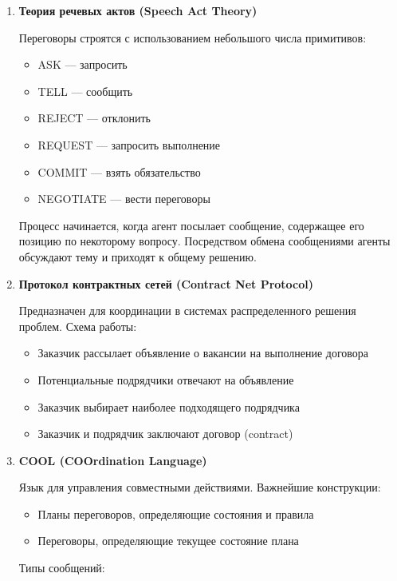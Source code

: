 \begin{enumerate}
  \item \textbf{Теория речевых актов (Speech Act Theory)}
  
  Переговоры строятся с использованием небольшого числа примитивов:
  
  \begin{itemize}
    \item ASK — запросить
    \item TELL — сообщить
    \item REJECT — отклонить
    \item REQUEST — запросить выполнение
    \item COMMIT — взять обязательство
    \item NEGOTIATE — вести переговоры
  \end{itemize}
  
  Процесс начинается, когда агент посылает сообщение, содержащее его позицию по некоторому вопросу. Посредством обмена сообщениями агенты обсуждают тему и приходят к общему решению.
  
  \item \textbf{Протокол контрактных сетей (Contract Net Protocol)}
  
  Предназначен для координации в системах распределенного решения проблем. Схема работы:
  
  \begin{itemize}
    \item Заказчик рассылает объявление о вакансии на выполнение договора
    \item Потенциальные подрядчики отвечают на объявление
    \item Заказчик выбирает наиболее подходящего подрядчика
    \item Заказчик и подрядчик заключают договор (contract)
  \end{itemize}
  
  \item \textbf{COOL (COOrdination Language)}
  
  Язык для управления совместными действиями. Важнейшие конструкции:
  
  \begin{itemize}
    \item Планы переговоров, определяющие состояния и правила
    \item Переговоры, определяющие текущее состояние плана
  \end{itemize}
  
  Типы сообщений:
  

\end{enumerate}
